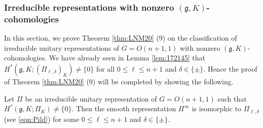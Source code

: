 \subsubsection{Irreducible representations with nonzero $({\mathfrak{g}},K)$-cohomologies}
\label{subsec:gKnonzero}

In this section,
 we prove Theorem \ref{thm:LNM20} (9)
 on the classification 
 of irreducible unitary representations of $G=O(n+1,1)$
 with nonzero $({\mathfrak{g}},K)$-cohomologies.  
We have already seen in Lemma \ref{lem:172145}
 that $H^{\ast}({\mathfrak{g}},K;(\Pi_{\ell,\delta})_K) \ne \{0\}$
 for all $0 \le \ell \le n+1$
 and $\delta \in \{\pm\}$.  
Hence the proof of Theorem \ref{thm:LNM20} (9) will be completed
 by showing the following.  
\begin{proposition}
\label{prop:gKq}
Let $\Pi$ be an irreducible unitary representation
 of $G=O(n+1,1)$
 such that 
 $H^{\ast}({\mathfrak{g}},K;\Pi_K) \ne \{0\}$.  
Then the smooth representation $\Pi^{\infty}$ is isomorphic 
 to 
 $\Pi_{\ell,\delta}$
 (see \eqref{eqn:Pild})
 for some $0 \le \ell \le n+1$ and $\delta \in \{\pm\}$.  
\end{proposition}

